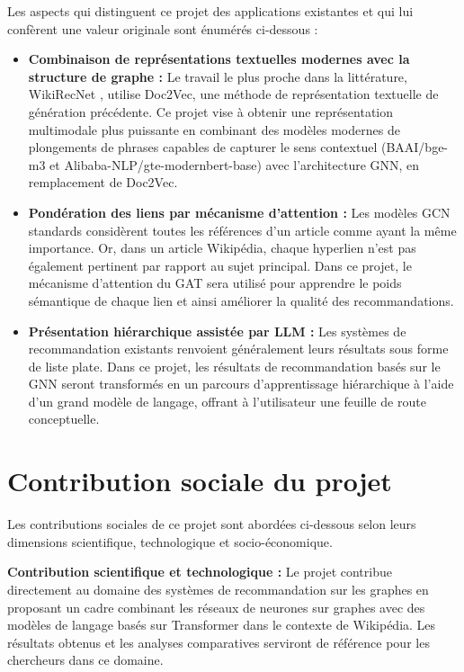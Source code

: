 Les aspects qui distinguent ce projet des applications existantes et qui lui confèrent une valeur originale sont énumérés ci-dessous :

\begin{itemize}
    \item \textbf{Combinaison de représentations textuelles modernes avec la structure de graphe :} Le travail le plus proche dans la littérature, WikiRecNet \cite{wikirecnet2020}, utilise Doc2Vec, une méthode de représentation textuelle de génération précédente. Ce projet vise à obtenir une représentation multimodale plus puissante en combinant des modèles modernes de plongements de phrases capables de capturer le sens contextuel (BAAI/bge-m3 et Alibaba-NLP/gte-modernbert-base) avec l'architecture GNN, en remplacement de Doc2Vec.

    \item \textbf{Pondération des liens par mécanisme d'attention :} Les modèles GCN standards considèrent toutes les références d'un article comme ayant la même importance. Or, dans un article Wikipédia, chaque hyperlien n'est pas également pertinent par rapport au sujet principal. Dans ce projet, le mécanisme d'attention du GAT sera utilisé pour apprendre le poids sémantique de chaque lien et ainsi améliorer la qualité des recommandations.

    \item \textbf{Présentation hiérarchique assistée par LLM :} Les systèmes de recommandation existants renvoient généralement leurs résultats sous forme de liste plate. Dans ce projet, les résultats de recommandation basés sur le GNN seront transformés en un parcours d'apprentissage hiérarchique à l'aide d'un grand modèle de langage, offrant à l'utilisateur une feuille de route conceptuelle.
\end{itemize}

\section{Contribution sociale du projet}

Les contributions sociales de ce projet sont abordées ci-dessous selon leurs dimensions scientifique, technologique et socio-économique.

\textbf{Contribution scientifique et technologique :}
Le projet contribue directement au domaine des systèmes de recommandation sur les graphes en proposant un cadre combinant les réseaux de neurones sur graphes avec des modèles de langage basés sur Transformer dans le contexte de Wikipédia. Les résultats obtenus et les analyses comparatives serviront de référence pour les chercheurs dans ce domaine.

